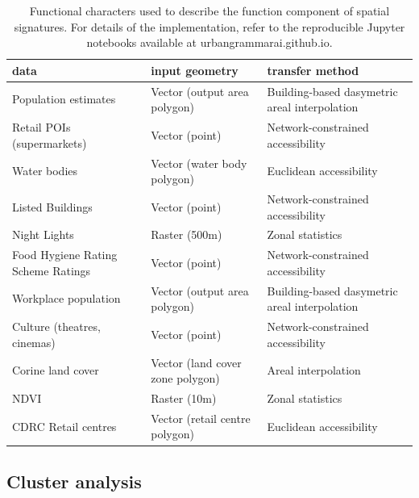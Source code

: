 \begin{table}
\begin{tabular}{lll}
\toprule
                                data &                   input geometry &                               transfer method \\
\midrule
                Population estimates &     Vector (output area polygon) & Building-based dasymetric areal interpolation \\
        Retail POIs (supermarkets) &                   Vector (point) &             Network-constrained accessibility \\
                        Water bodies &      Vector (water body polygon) &                       Euclidean accessibility \\
                    Listed Buildings &                   Vector (point) &             Network-constrained accessibility \\
                        Night Lights &                    Raster (500m) &                              Zonal statistics \\
Food Hygiene Rating Scheme Ratings &                   Vector (point) &             Network-constrained accessibility \\
                Workplace population &     Vector (output area polygon) & Building-based dasymetric areal interpolation \\
        Culture (theatres, cinemas) &                   Vector (point) &             Network-constrained accessibility \\
                    Corine land cover & Vector (land cover zone polygon) &                           Areal interpolation \\
                                NDVI &                     Raster (10m) &                              Zonal statistics \\
                CDRC Retail centres &   Vector (retail centre polygon) &                       Euclidean accessibility \\
\bottomrule
\end{tabular}

\caption{\label{tab:function}Functional characters used to
describe the function component of spatial signatures. For details of the implementation,
refer to the reproducible Jupyter notebooks available at urbangrammarai.github.io.}
\end{table}

\subsection*{Cluster analysis}

